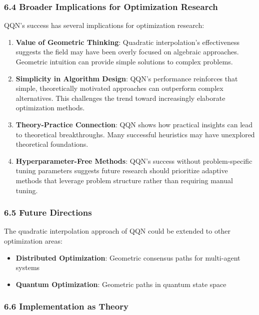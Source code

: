 \hypertarget{broader-implications-for-optimization-research}{%
\subsubsection{6.4 Broader Implications for Optimization Research}\label{broader-implications-for-optimization-research}}

QQN's success has several implications for optimization research:

\begin{enumerate}
\def\labelenumi{\arabic{enumi}.}
\item
  \textbf{Value of Geometric Thinking}: Quadratic interpolation's effectiveness suggests the field may have been overly focused on algebraic approaches. Geometric intuition can provide simple solutions to complex problems.
\item
  \textbf{Simplicity in Algorithm Design}: QQN's performance reinforces that simple, theoretically motivated approaches can outperform complex alternatives. This challenges the trend toward increasingly elaborate optimization methods.
\item
  \textbf{Theory-Practice Connection}: QQN shows how practical insights can lead to theoretical breakthroughs. Many successful heuristics may have unexplored theoretical foundations.
\item
  \textbf{Hyperparameter-Free Methods}: QQN's success without problem-specific tuning parameters suggests future research should prioritize adaptive methods that leverage problem structure rather than requiring manual tuning.
\end{enumerate}

\hypertarget{future-directions}{%
\subsubsection{6.5 Future Directions}\label{future-directions}}

The quadratic interpolation approach of QQN could be extended to other optimization areas:

\begin{itemize}
\tightlist
\item
  \textbf{Distributed Optimization}: Geometric consensus paths for multi-agent systems
\item
  \textbf{Quantum Optimization}: Geometric paths in quantum state space
\end{itemize}

\hypertarget{implementation-as-theory}{%
\subsubsection{6.6 Implementation as Theory}\label{implementation-as-theory}}

